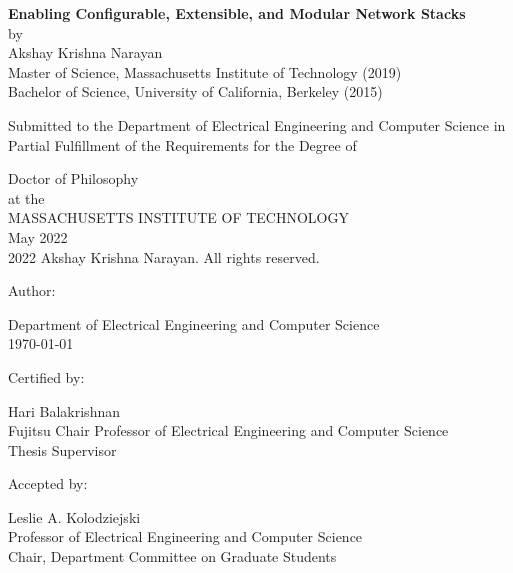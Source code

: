 \documentclass[fontsize=12pt,paper=letter]{scrartcl}
\begin{document}
\begin{titlepage}
  \begin{center}
    \textbf{\large Enabling Configurable, Extensible, and Modular Network Stacks}\\
    \vspace{0.5\baselineskip}
    by\\
    \vspace{0.5\baselineskip}
    {\large Akshay Krishna Narayan}\\
    \vspace{0.5\baselineskip}
    Master of Science, Massachusetts Institute of Technology (2019)\\
    Bachelor of Science, University of California, Berkeley (2015)\\
    \vspace{0.5\baselineskip}
    \begin{addmargin}[0.1in]{0.1in}
      \centering
      Submitted to the Department of
      Electrical Engineering and Computer Science
      in Partial Fulfillment of the Requirements for the Degree of\\
    \end{addmargin}
    \vspace{0.5\baselineskip}
    Doctor of Philosophy\\
    \vspace{0.5\baselineskip}
    at the\\
    \vspace{0.5\baselineskip}
    MASSACHUSETTS INSTITUTE OF TECHNOLOGY\\
    \vspace{0.5\baselineskip}
    May 2022\\
    \textcopyright{} 2022 Akshay Krishna Narayan.
    All rights reserved.
  \end{center}

  \vspace{2\baselineskip}
  {
  \raggedright
  Author: \dotfill

  \raggedleft
  Department of Electrical Engineering and Computer Science\\
  \today{}\\
  }

  \vspace{2\baselineskip}
  {
  \raggedright
  Certified by: \dotfill

  \raggedleft
  Hari Balakrishnan\\
  Fujitsu Chair Professor of Electrical Engineering and Computer Science\\
  Thesis Supervisor\\
  }

  \vspace{2\baselineskip}

  {
  \raggedright
  Accepted by: \dotfill

  \raggedleft
  Leslie A. Kolodziejski\\
  Professor of Electrical Engineering and Computer Science\\
  Chair, Department Committee on Graduate Students\\
  }
\end{titlepage}
\end{document}
